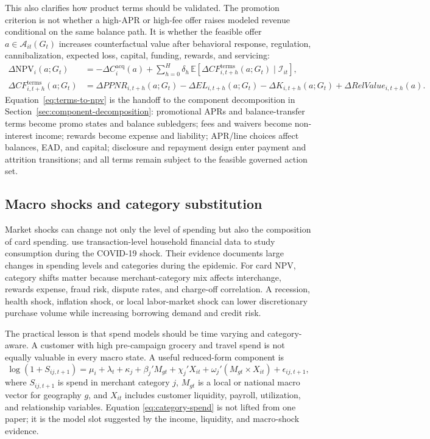 \documentclass[11pt]{article}
\newcommand{\E}{\mathbb{E}}
\newcommand{\NPV}{\mathrm{NPV}}
\newcommand{\1}{\mathbf{1}}
\begin{document}
This also clarifies how product terms should be validated. The promotion
criterion is not whether a high-APR or high-fee offer raises modeled revenue
conditional on the same balance path. It is whether the feasible offer
$a\in\mathcal{A}_{it}(G_t)$ increases counterfactual value after behavioral
response, regulation, cannibalization, expected loss, capital, funding, rewards,
and servicing:
\begin{align}
  \Delta \NPV_i(a;G_t)
  &=
  -\Delta C_i^{\mathrm{acq}}(a)
  +
  \sum_{h=0}^{H}\delta_h\,
  \E\!\left[
    \Delta CF^{\mathrm{terms}}_{i,t+h}(a;G_t)
    \mid \mathcal{I}_{it}
  \right],
  \label{eq:terms-to-npv}\\
  \Delta CF^{\mathrm{terms}}_{i,t+h}(a;G_t)
  &=
  \Delta PPNR_{i,t+h}(a;G_t)
  - \Delta EL_{i,t+h}(a;G_t)
  - \Delta K_{i,t+h}(a;G_t)
  + \Delta RelValue_{i,t+h}(a).
\end{align}
Equation~\eqref{eq:terms-to-npv} is the handoff to the component decomposition
in Section~\ref{sec:component-decomposition}: promotional APRs and
balance-transfer terms become promo states and balance subledgers; fees and
waivers become non-interest income; rewards become expense and liability;
APR/line choices affect balances, EAD, and capital; disclosure and repayment
design enter payment and attrition transitions; and all terms remain subject to
the feasible governed action set.

\subsection{Macro shocks and category substitution}

Market shocks can change not only the level of spending but also the composition
of card spending. \citet{baker2020epidemic} use transaction-level household
financial data to study consumption during the COVID-19 shock. Their evidence
documents large changes in spending levels and categories during the epidemic.
For card NPV, category shifts matter because merchant-category mix affects
interchange, rewards expense, fraud risk, dispute rates, and charge-off
correlation. A recession, health shock, inflation shock, or local labor-market
shock can lower discretionary purchase volume while increasing borrowing demand
and credit risk.

The practical lesson is that spend models should be time varying and
category-aware. A customer with high pre-campaign grocery and travel spend is
not equally valuable in every macro state. A useful reduced-form component is
\begin{equation}
  \log(1+S_{ij,t+1})
  =
  \mu_i + \lambda_t + \kappa_j
  + \beta_j' M_{gt}
  + \chi_j' X_{it}
  + \omega_j' (M_{gt}\times X_{it})
  + \epsilon_{ij,t+1},
  \label{eq:category-spend}
\end{equation}
where $S_{ij,t+1}$ is spend in merchant category $j$, $M_{gt}$ is a local or
national macro vector for geography $g$, and $X_{it}$ includes customer
liquidity, payroll, utilization, and relationship variables. Equation
\eqref{eq:category-spend} is not lifted from one paper; it is the model slot
suggested by the income, liquidity, and macro-shock evidence.
\end{document}
